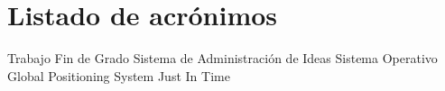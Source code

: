 \chapter{Listado de acrónimos}

{\small
\begin{acronym}[XXXXXXXX]
	 {Trabajo Fin de Grado}
	 {Sistema de Administración de Ideas}
	 {Sistema Operativo}
	 {Global Positioning System}
	 {Just In Time}
\end{acronym}
}




